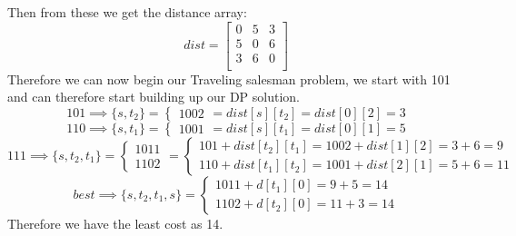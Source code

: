 \documentclass[12pt]{article}
\begin{document}
Then from these we get the distance array:
\[
dist =
\begin{bmatrix}
0 & 5 & 3 \\
5 & 0 & 6 \\
3 & 6 & 0 \\
\end{bmatrix}
\]
Therefore we can now begin our Traveling salesman problem, we start with 101 and can therefore
start building up our DP solution.
\[
101 \implies \{s,t_2\} =
\begin{cases}
1002
\end{cases}
= dist[s][t_2] = dist[0][2] = 3
\]
\[
110 \implies \{s,t_1\} =
\begin{cases}
1001
\end{cases}
= dist[s][t_1] = dist[0][1] = 5
\]
\[
111 \implies \{s,t_2,t_1\} =
\begin{cases}
1011 \\
1102
\end{cases}
=
\begin{cases}
101 + dist[t_2][t_1] = 1002 + dist[1][2] = 3 + 6 = 9 \\
110 + dist[t_1][t_2] = 1001 + dist[2][1] = 5 + 6 = 11
\end{cases}
\]
\[
best \implies \{s,t_2,t_1,s\} =
\begin{cases}
1011 + d[t_1][0] = 9  + 5 = 14\\
1102 + d[t_2][0] = 11 + 3 = 14
\end{cases}
\]
Therefore we have the least cost as 14.



\end{document}
